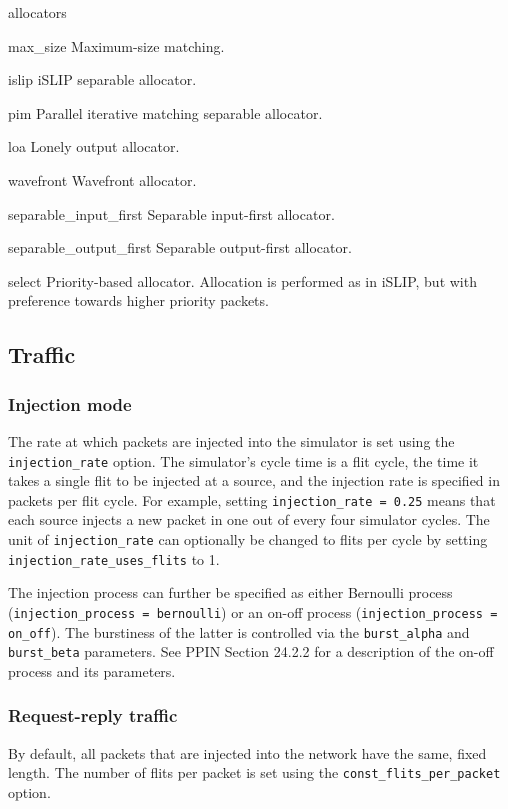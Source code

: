 \documentclass[11pt]{article}
\begin{document}
\begin{opt_list}{allocators}

\item[max\_size] Maximum-size matching. 
\item[islip] iSLIP separable allocator.
\item[pim] Parallel iterative matching separable allocator.
\item[loa] Lonely output allocator.
\item[wavefront] Wavefront allocator.
\item[separable\_input\_first] Separable input-first allocator.
\item[separable\_output\_first] Separable output-first allocator.
\item[select] Priority-based allocator.  Allocation is performed as in
iSLIP, but with preference towards higher priority packets.

\end{opt_list}

\subsection{Traffic}
\label{sec:traffic}


\subsubsection{Injection mode}
The rate at which packets are injected into the simulator is set using
the \texttt{injection\_rate} option.  The simulator's cycle time is a
flit cycle, the time it takes a single flit to be injected at a
source, and the injection rate is specified in packets per flit cycle.
For example, setting \texttt{injection\_rate = 0.25} means that each
source injects a new packet in one out of every four simulator cycles.
The unit of \texttt{injection\_rate} can optionally be changed to flits per cycle by 
setting \texttt{injection\_rate\_uses\_flits} to 1.

The injection process can further be specified as either Bernoulli process 
(\texttt{injection\_process = bernoulli}) or an on-off process
(\texttt{injection\_process = on\_off}).  The burstiness of the latter
is controlled via the \texttt{burst\_alpha} and
\texttt{burst\_beta} parameters.  See PPIN Section 24.2.2 for a
description of the on-off process and its parameters.

\subsubsection{Request-reply traffic}
By default, all packets that are injected into the network have the same, 
fixed length. The number of flits per packet is set using the
\texttt{const\_flits\_per\_packet} option. 
\end{document}
